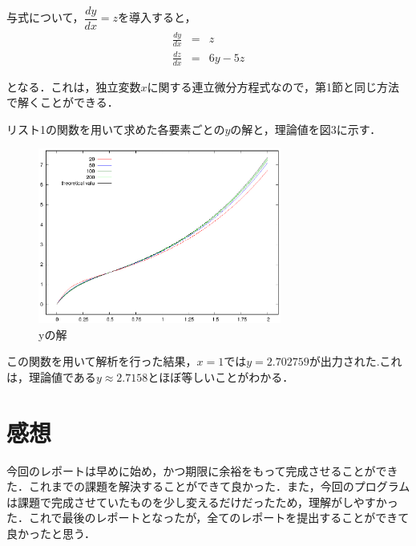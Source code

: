 \documentclass[dvipdfmx,titlepage]{jsarticle}
\begin{document}
与式について，$\dfrac{dy}{dx} = z$を導入すると，
\begin{eqnarray}
\frac{dy}{dx} &=& z \nonumber \\
\frac{dz}{dx} &=& 6y - 5z \nonumber
\end{eqnarray}

となる．これは，独立変数$x$に関する連立微分方程式なので，第1節と同じ方法で解くことができる．

リスト1の関数を用いて求めた各要素ごとの$y$の解と，理論値を図3に示す．
\begin{figure}[htbp]
  \begin{center}
    \includegraphics[width=8cm]{yy.eps}
    \caption{yの解}
    \label{q12}
  \end{center}
\end{figure}

この関数を用いて解析を行った結果，$x = 1$では$y = 2.702759$が出力された.これは，理論値である$y\approx 2.7158$とほぼ等しいことがわかる．

\section{感想}
今回のレポートは早めに始め，かつ期限に余裕をもって完成させることができた．これまでの課題を解決することができて良かった．また，今回のプログラムは課題で完成させていたものを少し変えるだけだったため，理解がしやすかった．これで最後のレポートとなったが，全てのレポートを提出することができて良かったと思う．
\end{document}

